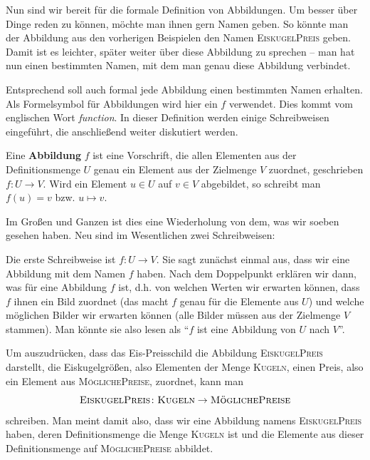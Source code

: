 \documentclass[../../main.tex]{subfiles}
\begin{document}
\label{sec:abbildungen_definition}
Nun sind wir bereit für die formale Definition von Abbildungen. Um besser über Dinge reden zu können, möchte man ihnen gern Namen geben. So könnte man der Abbildung aus den vorherigen Beispielen den Namen \textsc{EiskugelPreis} geben. Damit ist es leichter, später weiter über diese Abbildung zu sprechen -- man hat nun einen bestimmten Namen, mit dem man genau diese Abbildung verbindet.

Entsprechend soll auch formal jede Abbildung einen bestimmten Namen erhalten. Als Formelsymbol für Abbildungen wird hier ein $f$ verwendet. Dies kommt vom englischen Wort \emph{function}. In dieser Definition werden einige Schreibweisen eingeführt, die anschließend weiter diskutiert werden.

\begin{definition}[Abbildung]
Eine \textbf{Abbildung} $f$ ist eine Vorschrift, die allen Elementen aus der Definitionsmenge $U$ genau ein Element aus der Zielmenge $V$ zuordnet, geschrieben $f\colon U\rightarrow V$. Wird ein Element $u\in U$ auf $v\in V$ abgebildet, so schreibt man $f(u)=v$ bzw. $u\mapsto v$.
\end{definition}

Im Großen und Ganzen ist dies eine Wiederholung von dem, was wir soeben gesehen haben. Neu sind im Wesentlichen zwei Schreibweisen: 

Die erste Schreibweise ist \mbox{$f\colon U\rightarrow V$}. Sie sagt zunächst einmal aus, dass wir eine Abbildung mit dem Namen $f$ haben. Nach dem Doppelpunkt erklären wir dann, was für eine Abbildung $f$ ist, d.h. von welchen Werten wir erwarten können, dass $f$ ihnen ein Bild zuordnet (das macht $f$ genau für die Elemente aus $U$) und welche möglichen Bilder wir erwarten können (alle Bilder müssen aus der Zielmenge $V$ stammen). Man könnte sie also lesen als \enquote{$f$ ist eine Abbildung von $U$ nach $V$}.

\begin{example}
    Um auszudrücken, dass das Eis-Preisschild die Abbildung \textsc{EiskugelPreis} darstellt, die Eiskugelgrößen, also Elementen der Menge \textsc{Kugeln}, einen Preis, also ein Element aus \textsc{MöglichePreise}, zuordnet, kann man \[\textsc{EiskugelPreis}\colon\textsc{Kugeln}\rightarrow\textsc{MöglichePreise}\] schreiben. Man meint damit also, dass wir eine Abbildung namens \textsc{EiskugelPreis} haben, deren Definitionsmenge die Menge \textsc{Kugeln} ist und die Elemente aus dieser Definitionsmenge auf \textsc{MöglichePreise} abbildet.
\end{example}
\end{document}
